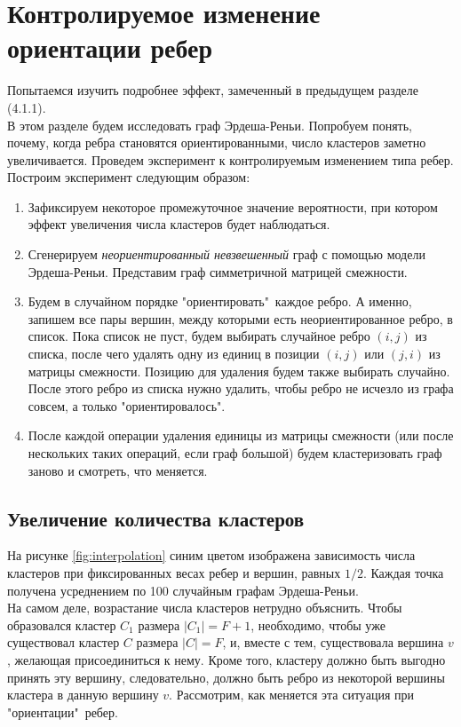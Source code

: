 \newpage
\section{Контролируемое изменение ориентации ребер}
Попытаемся изучить подробнее эффект, замеченный в предыдущем разделе (4.1.1).\\

В этом разделе будем исследовать граф Эрдеша-Реньи. Попробуем понять, почему, когда ребра становятся ориентированными, число кластеров заметно увеличивается. Проведем эксперимент к контролируемым изменением типа ребер. Построим эксперимент следующим образом:

\begin{enumerate}
	\item Зафиксируем некоторое промежуточное значение вероятности, при котором эффект увеличения числа кластеров будет наблюдаться. 
	
	\item Сгенерируем \textit{неориентированный невзвешенный} граф с помощью модели Эрдеша-Реньи. Представим граф симметричной матрицей смежности.
	
	\item Будем в случайном порядке "ориентировать"\ каждое ребро. А именно, запишем все пары вершин, между которыми есть неориентированное ребро, в список. Пока список не пуст, будем выбирать случайное ребро $(i, j)$ из списка, после чего удалять одну из единиц в позиции $(i,j)$ или $(j,i)$ из матрицы смежности. Позицию для удаления будем также выбирать случайно. После этого ребро из списка нужно удалить, чтобы ребро не исчезло из графа совсем, а только "ориентировалось".
	
	\item После каждой операции удаления единицы из матрицы смежности (или после нескольких таких операций, если граф большой) будем кластеризовать граф заново и смотреть, что меняется.
	
\end{enumerate}

\subsection{Увеличение количества кластеров}
На рисунке \ref{fig:interpolation} синим цветом изображена зависимость числа кластеров при фиксированных весах ребер и вершин, равных $1/2$. Каждая точка получена усреднением по 100 случайным графам Эрдеша-Реньи.\\

На самом деле, возрастание числа кластеров нетрудно объяснить. Чтобы образовался кластер $C_1$ размера $|C_1|=F+1$, необходимо, чтобы уже существовал кластер $C$ размера $|C|=F$, и, вместе с тем, существовала вершина $v$, желающая присоединиться к нему. Кроме того, кластеру должно быть выгодно принять эту вершину, следовательно, должно быть ребро из некоторой вершины кластера в данную вершину $v$. Рассмотрим, как меняется эта ситуация при "ориентации"\ ребер. \\

